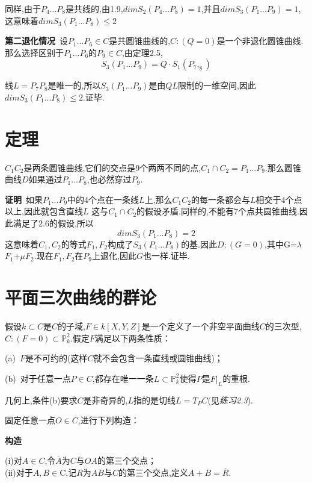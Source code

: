 \documentclass[UTF8]{book}
\begin{document}
		
		同样,由于$P_{4}...P_{8}$是共线的,由1.9,$dim S_{2}(P_{4} ... P_{8} )=1$,并且$dim S_{3}(P_{1} ... P_{9} )=1$,这意味着$dim S_{3}(P_{1} ... P_{8})\le 2$
		
		
		\textbf{第二退化情况}\ 设$P_{1} ... P_{6} \in C$是共圆锥曲线的,$ C:(Q=0) $是一个非退化圆锥曲线.那么选择区别于$P_{1} ... P_{6}$的$P_{9} \in C$,由定理2.5,
		\begin{equation*}
		S_{3}(P_{1} ... P_{9} )=Q· S_{1} (P_{7},_{8} )
		\end{equation*}
	
	
		线$L= P_{7} P_{8}$是唯一的,所以$S_{3}(P_{1}...P_{9})$是由$ QL $限制的一维空间,因此$dim S_{3}(P_{1} ... P_{8})\le 2$.证毕.
	\section{定理}
		$C_{1} C_{2}$是两条圆锥曲线,它们的交点是9个两两不同的点,$C_{1} \cap C_{2} ={ P_{1} ... P_{9} }$.那么圆锥曲线$ D $如果通过$P_{1} ... P_{8}$,也必然穿过$P_{9}$.
		
		
		\textbf{证明}\ 如果$P_{1} ... P_{9}$中的4个点在一条线$ L $上,那么$C_{1} C_{2}$的每一条都会与$ L $相交于4个点以上,因此就包含直线$ L $ 这与$C_{1}\cap C_{2}$的假设矛盾.同样的,不能有7个点共圆锥曲线.因此满足了2.6的假设,所以
		\begin{equation*}
		dim S_{3}\left(P_{1} \ldots P_{8}\right)=2
		\end{equation*}
		这意味着$C_{1},C_{2}$的等式$F_{1},F_{2}$构成了$S_{3}(P_{1} ... P_{8} )$的基.因此$ D:(G=0) $,其中G=$\lambda$$F_{1}$+$\mu$$F_{2}$.现在$F_{1},F_{2}$在$P_{9}$上退化,因此$ G $也一样.证毕.
	\section{平面三次曲线的群论}
		假设$ k \subset C $是$ C $的子域,$ F \in k[X,Y,Z] $是一个定义了一个非空平面曲线$ C $的三次型,$C:(F=0) \subset \mathbb{P}^{2}_{k}$.假定$ F $满足以下两条性质：
		
		
		(a)\ $ F $是不可约的(这样$ C $就不会包含一条直线或圆锥曲线)；
		
		
		(b)\ 对于任意一点$ P \in C $,都存在唯一一条$L \subset \mathbb{P}^{2}_{k}$使得$ P $是$F|_{L}$的重根.
		
		
		几何上,条件(b)要求$ C $是非奇异的,$ L $指的是切线$L=T_{P} C$(见\textit{练习2.3}).
		
		
		固定任意一点$ O \in C $,进行下列构造：
		
		
		\textbf{构造}\
		\begin{minipage}[t]{0.9\linewidth}
			(i)对$ A \in C $,令$\overline{A}$为$ C $与$ OA $的第三个交点；\\
			(ii)对于$A,B\in$C,记$ R $为$ AB $与$ C $的第三个交点,定义$A+B=\overline{R}$.
		\end{minipage}
		
\end{document}
